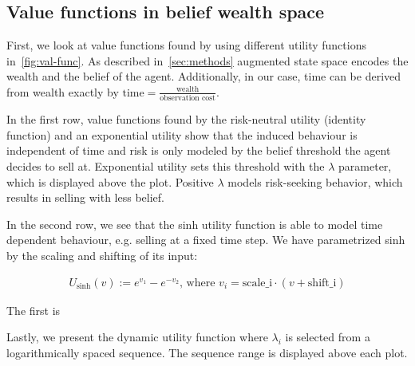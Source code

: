 \subsection{Value functions in belief wealth space}\label{ssec:val-func}

First, we look at value functions found by using different utility functions in~\autoref{fig:val-func}.
As described in~\autoref{sec:methods} augmented state space encodes the wealth and the belief of the agent. 
Additionally, in our case, time can be derived from wealth exactly by $\text{time} = \frac{\text{wealth}}{\text{observation\ cost}}$.

In the first row, value functions found by the risk-neutral utility (identity function) and an exponential utility show that the induced behaviour is independent of time and risk is only modeled by the belief threshold the agent decides to sell at.
Exponential utility sets this threshold with the $\lambda$ parameter, which is displayed above the plot.
Positive $\lambda$ models risk-seeking behavior, which results in selling with less belief.

In the second row, we see that the sinh utility function is able to model time dependent behaviour, e.g. selling at a fixed time step. We have parametrized sinh by the scaling and shifting of its input:

\begin{align*}
    U_\text{sinh}(v) := e^{v_1} - e^{-v_2} \text{, where\ } v_i = \text{scale_i}\cdot(v+\text{shift_i})
\end{align*}

The first is 


Lastly, we present the dynamic utility function where $\lambda_i$ is selected from a logarithmically spaced sequence. The sequence range is displayed above each plot.


